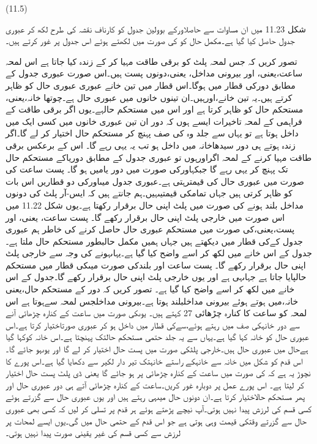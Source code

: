  
(11.5)

	شکل 11.23 میں ان مساوات سے حاصلاورکے بوولین جدول  کو کارناف نقشہ کی طرح لکھ کر عبوری جدول حاصل کیا گیا ہے۔مکمل حال کو کی صورت میں لکھتے ہوئے اس جدول پر غور کرتے ہیں۔


	تصور کریں کہ جس لمحہ پلٹ کو برقی طاقت مہیا کر کے زندہ کیا جاتا ہے  اس لمحہ  ساعت،یعنی، اور بیرونی مداخل، یعنی،دونوں پست ہیں۔اس صورت عبوری جدول کے مطابق دورکی قطار میں ہوگا۔اس قطار میں تین خانے عبوری عبوری حال  کو ظاہر کرتے ہیں۔یہ تین خانے،اورہیں۔ان تینوں خانوں میں عبوری حال ہے۔چوتھا خانہ،یعنی، مستحکم حال کو ظاہر کرتا ہے اور اس میں مستحکم حالہے۔یوں اگر برقی طاقت کے فراہمی کے لمحہ تاخیرات ایسے ہوں کہ دور ان تین عبوری خانوں میں کسی ایک میں داخل ہوتا ہے تو یہاں سے جلد وہ کی صف پہنچ کر مستحکم حال اختیار کر لے گا۔اگر زندہ ہوتے ہی دور سیدھاخانہ میں داخل ہو تب یہ یہی رہے گا۔
	اس کے برعکس برقی طاقت مہیا کرنے کے لمحہ اگراورہوں تو عبوری جدول کے مطابق دوریاکے مستحکم حال تک پہنچ کر یہی رہے گا جبکہاورکی صورت میں دور یامیں ہو گا۔
	پست ساعت کی صورت میں عبوری حال کی قیمترہتی ہے۔عبوری جدول میںاورکی دو قطاریں اس بات کو ظاہر کرتی ہیں جہاں تمامکی قیمتیںہیں۔ہم جانتے ہیں کہ ایس-آر پلٹ کی دونوں مداخل بلند ہونے کی صورت میں پلٹ اپنی حال برقرار رکھتا ہے۔یوں شکل 11.22 میں اس صورت میں خارجی پلٹ اپنی حال برقرار رکھے گا۔
	پست ساعت، یعنی، اور پست،یعنی،کی صورت میں مستحکم عبوری حال  حاصل کرنے کی خاطر ہم عبوری جدول کےکی قطار میں دیکھتے ہیں جہاں ہمیں مکمل حالبطور مستحکم حال ملتا ہے۔جدول کے اس خانے میں لکھ کر اسے واضح کیا گیا ہے۔یہاںہونے کی وجہ سے خارجی پلٹ اپنی حال برقرار رکھے گا۔
	پست ساعت اور بلندکی صورت میںکی قطار میں مستحکم حالپایا جاتا ہے جہاںہی ہے اور یوں خارجی پلٹ اپنی حال برقرار رکھے گا۔جدول کے اس خانے میں لکھ کر اسے واضح کیا گیا ہے۔
	تصور کریں کہ دور کے مستحکم حال،یعنی خانہ،میں ہوتے ہوئے بیرونی مداخلبلند ہوتا ہے۔بیرونی مداخلجس لمحہ سےہوتا ہے اس لمحہ کو ساعت کا کنارہ چڑھائی 27 کہتے ہیں۔ یوںکی صورت میں ساعت کے کنارہ چڑھائی آنے سے دور خانہکی صف میں رہتے ہوئے،سےکی قطار میں داخل ہو کر عبوری صورتاختیار کرتا ہے۔اس عبوری حال  کو خانہ کہا گیا ہے۔یہاں سے یہ جلد حتمی مستحکم حالتک پہنچتا ہے۔اس خانہ کوکہا گیا ہےحال میں عبوری حال  ہیں۔خارجی پلٹکی صورت میں پست حال اختیار کر لے گا اور یوںہو جائے گا۔اس قدم کو شکل میں خانہ سے  خانہکے راستے خانہتک تیر دار  لکیر سے دکھایا گیا ہے۔اس پورے کا نچوڑ یہ ہے کہ کی صورت میں ساعت کے کنارہ چڑھائی پر ہو جائے گا یعنی ڈی پلٹ پست حال اختیار کر لیتا ہے۔
	اس پورے عمل پر دوبارہ غور کریں۔ساعت کے کنارہ چڑھائی آتے ہی دور عبوری حال اور پھر مستحکم حالاختیار کرتا ہے۔ان دونوں حال میںہی رہتے ہیں اور یوں عبوری حال  سے گزرتے ہوئے کسی قسم کی لرزش پیدا نہیں ہوتی۔آپ نیچے پڑھتے ہوئے ہر قدم پر تسلی کر لیں کہ کسی بھی عبوری حال  سے گزرتے وقتکی قیمت وہی ہوتی ہے جو اس قدم کے حتمی حال میں گی۔یوں ایسے لمحات پر لرزش سے کسی قسم کی غیر یقینی صورت پیدا نہیں ہوتی۔
